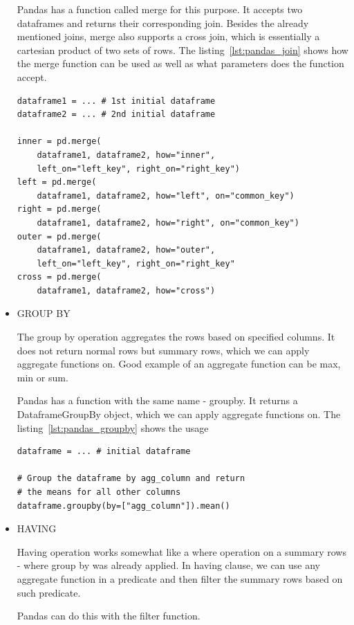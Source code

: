 \begin{itemize}
    Pandas has a function called merge for this purpose.
    It accepts two dataframes and returns their corresponding join.
    Besides the already mentioned joins, merge also supports a cross join, which is essentially a cartesian product of
    two sets of rows.
    The listing~\ref{lst:pandas_join} shows how the merge function can be used as well as what parameters does the
    function accept.

    \begin{lstlisting}[caption=Join in Pandas, label={lst:pandas_join}, captionpos=b]
dataframe1 = ... # 1st initial dataframe
dataframe2 = ... # 2nd initial dataframe

inner = pd.merge(
    dataframe1, dataframe2, how="inner",
    left_on="left_key", right_on="right_key")
left = pd.merge(
    dataframe1, dataframe2, how="left", on="common_key")
right = pd.merge(
    dataframe1, dataframe2, how="right", on="common_key")
outer = pd.merge(
    dataframe1, dataframe2, how="outer",
    left_on="left_key", right_on="right_key"
cross = pd.merge(
    dataframe1, dataframe2, how="cross")
    \end{lstlisting}

    \item GROUP BY

    The group by operation aggregates the rows based on specified columns.
    It does not return normal rows but summary rows, which we can apply aggregate functions on.
    Good example of an aggregate function can be max, min or sum.

    Pandas has a function with the same name - groupby.
    It returns a DataframeGroupBy object, which we can apply aggregate functions on.
    The listing~\ref{lst:pandas_groupby} shows the usage

    \begin{lstlisting}[caption=Group by in Pandas, label={lst:pandas_groupby}, captionpos=b]
dataframe = ... # initial dataframe

# Group the dataframe by agg_column and return
# the means for all other columns
dataframe.groupby(by=["agg_column"]).mean()
    \end{lstlisting}

    \item HAVING

    Having operation works somewhat like a where operation on a summary rows - where group by was already applied.
    In having clause, we can use any aggregate function in a predicate and then filter the summary rows based on such
    predicate.

    Pandas can do this with the filter function. %

\end{itemize}


